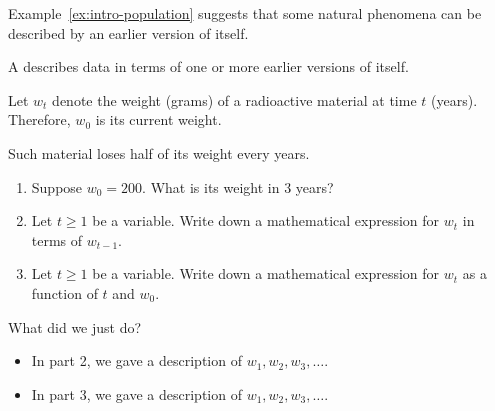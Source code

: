 \documentclass[../main.tex]{subfiles}
\begin{document}
Example~\ref{ex:intro-population} suggests that some natural phenomena can be described by an earlier version of itself. 

\begin{mdframed}[style=simple-compact]
 A  describes data in terms of one or more earlier versions of itself.
\end{mdframed}

\begin{example}
  Let \(w_{t}\) denote the weight (grams) of a radioactive material at time \(t\) (years). Therefore, \(w_{0}\) is its current weight. 

  Such material loses half of its weight every years. 
  \begin{enumerate}[wide]
    \item Suppose \(w_{0} = 200\). What is its weight in \(3\) years?
    \item Let \(t \ge 1\) be a variable. Write down a mathematical expression for \(w_{t}\) in terms of \(w_{t-1}\).
    \item Let \(t \ge 1\) be a variable. Write down a mathematical expression for \(w_{t}\) as a function of \(t\) and \(w_{0}\).
  \end{enumerate}

  What did we just do? 
  \begin{itemize}[itemsep=2ex]
    \item In part 2, we gave a \underline{\hspace{2in}} description of \(w_{1}, w_{2}, w_{3}, \ldots\). 
    \item In part 3, we gave a \underline{\hspace{2in}} description of \(w_{1}, w_{2}, w_{3}, \ldots\). 
  \end{itemize}
\end{example}

\clearpage
\end{document}
